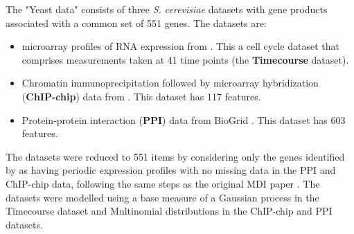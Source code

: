 \documentclass[]{article}
\begin{document}
The "Yeast data" consists of three \emph{S. cerevisiae} datasets with gene products associated with a common set of 551 genes. The datasets are:
\begin{itemize}
	\item microarray profiles of RNA expression from \cite{granovskaia2010high}. This a cell cycle dataset that comprises measurements taken at 41 time points (the \textbf{Timecourse} dataset).
	\item Chromatin immunoprecipitation followed by microarray hybridization (\textbf{ChIP-chip}) data from \cite{harbison2004transcriptional}. This dataset has 117 features.
	\item Protein-protein interaction (\textbf{PPI}) data from BioGrid \citep{stark2006biogrid}. This dataset has 603 features.
\end{itemize}
The datasets were reduced to 551 items by considering only the genes identified by \cite{granovskaia2010high} as having periodic expression profiles with no missing data in the PPI and ChIP-chip data, following the same steps as the original MDI paper \citep{kirk2012bayesian}. The datasets were modelled using a base measure of a Gaussian process in the Timecourse dataset and Multinomial distributions in the ChIP-chip and PPI datasets.
\end{document}
